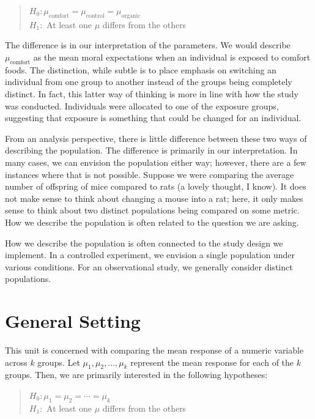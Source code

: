 \documentclass[]{book}
\theoremstyle{definition}
\theoremstyle{definition}
\theoremstyle{definition}
\theoremstyle{remark}
\let\BeginKnitrBlock\begin \let\EndKnitrBlock\end
\begin{document}
\begin{quote}
\(H_0: \mu_{\text{comfort}} = \mu_{\text{control}} = \mu_{\text{organic}}\)\\
\(H_1:\) At least one \(\mu\) differs from the others
\end{quote}

The difference is in our interpretation of the parameters. We would
describe \(\mu_{\text{comfort}}\) as the mean moral expectations when an
individual is exposed to comfort foods. The distinction, while subtle is
to place emphasis on switching an individual from one group to another
instead of the groups being completely distinct. In fact, this latter
way of thinking is more in line with how the study was conducted.
Individuals were allocated to one of the exposure groups, suggesting
that exposure is something that could be changed for an individual.

From an analysis perspective, there is little difference between these
two ways of describing the population. The difference is primarily in
our interpretation. In many cases, we can envision the population either
way; however, there are a few instances where that is not possible.
Suppose we were comparing the average number of offspring of mice
compared to rats (a lovely thought, I know). It does not make sense to
think about changing a mouse into a rat; here, it only makes sense to
think about two distinct populations being compared on some metric. How
we describe the population is often related to the question we are
asking.

\BeginKnitrBlock{rmdtip}
How we describe the population is often connected to the study design we
implement. In a controlled experiment, we envision a single population
under various conditions. For an observational study, we generally
consider distinct populations.
\EndKnitrBlock{rmdtip}

\section{General Setting}\label{general-setting}

This unit is concerned with comparing the mean response of a numeric
variable across \(k\) groups. Let \(\mu_1, \mu_2, \dotsc, \mu_k\)
represent the mean response for each of the \(k\) groups. Then, we are
primarily interested in the following hypotheses:

\begin{quote}
\(H_0: \mu_1 = \mu_2 = \dotsb = \mu_k\)\\
\(H_1:\) At least one \(\mu\) differs from the others
\end{quote}
\end{document}
